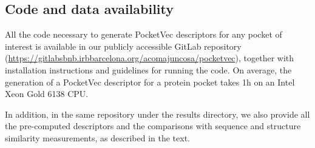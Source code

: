 \subsection{Code and data availability}
\label{PocketVec_Code}

All the code necessary to generate PocketVec descriptors for any pocket of interest is available in our publicly accessible GitLab repository (\href{https://gitlabsbnb.irbbarcelona.org/acomajuncosa/pocketvec}{https://gitlabsbnb.irbbarcelona.org/acomajuncosa/pocketvec}), together with installation instructions and guidelines for running the code. On average, the generation of a PocketVec descriptor for a protein pocket takes 1h on an Intel Xeon Gold 6138 CPU.

In addition, in the same repository under the results directory, we also provide all the pre-computed descriptors and the comparisons with sequence and structure similarity measurements, as described in the text.


